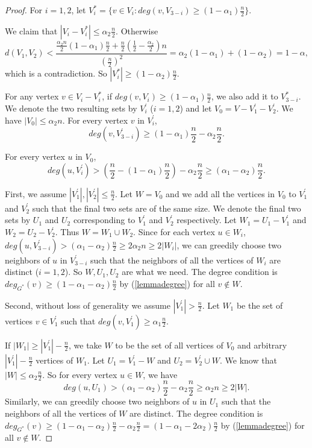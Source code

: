 \documentclass[11pt]{article}
\begin{document}
\begin{proof}
For $i=1,2$, let $V_i^*=\{v\in V_i: deg(v,V_{3-i})\geq (1-\alpha_1)\frac{n}{2}\}$.

We claim that $|V_i-V_i^*|\leq \alpha_2\frac{n}{2}$. Otherwise
$$d(V_1,V_2)< \frac{\frac{\alpha_2n}{2}(1-\alpha_1)\frac{n}{2}+\frac{n}{2}(\frac{1}{2}-\frac{\alpha_2}{2})n}{(\frac{n}{2})^2}=\alpha_2(1-\alpha_1)+(1-\alpha_2)=1-\alpha,$$
which is a contradiction. So $|V_i^*|\geq (1-\alpha_2)\frac{n}{2}$.

For any vertex $v\in V_i-V_i^*$, if $deg(v,V_i)\geq (1-\alpha_1)\frac{n}{2}$, we also add it to $V_{3-i}^*$. We denote the two resulting sets by $V_i^{'}$ ($i=1,2$) and let $V_0=V-V_1^{'}-V_2^{'}$. We have $|V_0|\leq \alpha_2n$. For every vertex $v$ in $V_i^{'}$,
\begin{equation}\label{lemmadegree}
deg(v,V_{3-i}^{'})\geq (1-\alpha_1)\frac{n}{2}-\alpha_2\frac{n}{2}.
\end{equation}

For every vertex $u$ in $V_0$,
$$deg(u,V_i^{'})> (\frac{n}{2}-(1-\alpha_1)\frac{n}{2})-\alpha_2\frac{n}{2}\geq (\alpha_1-\alpha_2)\frac{n}{2}.$$

First, we assume $|V_1^{'}|,|V_2^{'}|\leq \frac{n}{2}$. Let $W=V_0$ and we add all the vertices in $V_0$ to $V_1^{'}$ and $V_2^{'}$ such that the final two sets are of the same size. We denote the final two sets by $U_1$ and $U_2$ corresponding to $V_1^{'}$ and $V_2^{'}$ respectively. Let $W_1=U_1-V_1^{'}$ and $W_2=U_2-V_2^{'}$. Thus $W=W_1\cup W_2$. Since for each vertex $u\in W_i$, $deg(u,V_{3-i}^{'})>(\alpha_1-\alpha_2)\frac{n}{2}\geq 2\alpha_2n\geq 2|W_i|$, we can greedily choose two neighbors of $u$ in $V_{3-i}^{'}$ such that the neighbors of all the vertices of $W_i$ are distinct ($i=1,2$). So $W,U_1,U_2$ are what we need. The degree condition is $deg_{G^*}(v)\geq (1-\alpha_1-\alpha_2)\frac{n}{2}$ by (\ref{lemmadegree}) for all $v\not \in W$.

Second, without loss of generality we assume $|V_1^{'}|>\frac{n}{2}$. Let $W_1$ be the set of vertices $v\in V_1^{'}$ such that $deg(v,V_1^{'})\geq \alpha_1\frac{n}{2}$.

If $|W_1|\geq |V_1^{'}|-\frac{n}{2}$, we take $W$ to be the set of all vertices of $V_0$ and arbitrary $|V_1^{'}|-\frac{n}{2}$ vertices of $W_1$. Let $U_1=V_1^{'}-W$ and $U_2=V_2^{'}\cup W$. We know that $|W|\leq \alpha_2\frac{n}{2}$. So for every vertex $u\in W$, we have
\begin{equation*}
deg(u,U_1)>(\alpha_1-\alpha_2)\frac{n}{2}-\alpha_2\frac{n}{2}\geq \alpha_2n\geq 2|W|.
\end{equation*}
Similarly, we can greedily choose two neighbors of $u$ in $U_1$ such that the neighbors of all the vertices of $W$ are distinct. The degree condition is $deg_{G^*}(v)\geq (1-\alpha_1-\alpha_2)\frac{n}{2}-\alpha_2\frac{n}{2}=(1-\alpha_1-2\alpha_2)\frac{n}{2}$ by (\ref{lemmadegree}) for all $v\not \in W$.


\end{proof}
\end{document}
